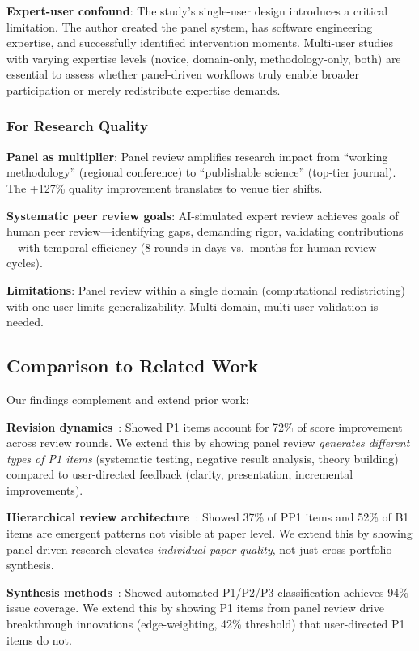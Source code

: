 \textbf{Expert-user confound}: The study's single-user design introduces a critical limitation. The author created the panel system, has software engineering expertise, and successfully identified intervention moments. Multi-user studies with varying expertise levels (novice, domain-only, methodology-only, both) are essential to assess whether panel-driven workflows truly enable broader participation or merely redistribute expertise demands.

\subsubsection{For Research Quality}

\textbf{Panel as multiplier}: Panel review amplifies research impact from ``working methodology'' (regional conference) to ``publishable science'' (top-tier journal). The +127\% quality improvement translates to venue tier shifts.

\textbf{Systematic peer review goals}: AI-simulated expert review achieves goals of human peer review---identifying gaps, demanding rigor, validating contributions---with temporal efficiency (8 rounds in days vs.\ months for human review cycles).

\textbf{Limitations}: Panel review within a single domain (computational redistricting) with one user limits generalizability. Multi-domain, multi-user validation is needed.

\subsection{Comparison to Related Work}

Our findings complement and extend prior work:

\textbf{Revision dynamics}~\cite{dellalibera2026revision}: Showed P1 items account for 72\% of score improvement across review rounds. We extend this by showing panel review \emph{generates different types of P1 items} (systematic testing, negative result analysis, theory building) compared to user-directed feedback (clarity, presentation, incremental improvements).

\textbf{Hierarchical review architecture}~\cite{dellalibera2026hierarchical}: Showed 37\% of PP1 items and 52\% of B1 items are emergent patterns not visible at paper level. We extend this by showing panel-driven research elevates \emph{individual paper quality}, not just cross-portfolio synthesis.

\textbf{Synthesis methods}~\cite{dellalibera2026synthesis}: Showed automated P1/P2/P3 classification achieves 94\% issue coverage. We extend this by showing P1 items from panel review drive breakthrough innovations (edge-weighting, 42\% threshold) that user-directed P1 items do not.

